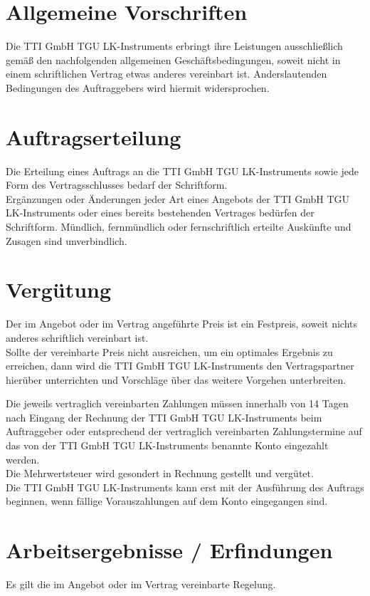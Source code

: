 \documentclass[a4paper, final, 11pt, oneside]{scrartcl}
\begin{document}
\begin{multicols}{2}
\section{Allgemeine Vorschriften}
Die TTI GmbH TGU LK-Instruments erbringt ihre Leistungen ausschließlich gemäß den nachfolgenden allgemeinen Geschäftsbedingungen, soweit nicht in einem schriftlichen Vertrag etwas anderes vereinbart ist. Anderslautenden Bedingungen des Auftraggebers wird hiermit widersprochen.

\section{Auftragserteilung}
Die Erteilung eines Auftrags an die TTI GmbH TGU LK-Instruments sowie jede Form des Vertragsschlusses bedarf der Schriftform.\\
Ergänzungen oder Änderungen jeder Art eines Angebots der TTI GmbH TGU LK-Instruments oder eines bereits bestehenden Vertrages bedürfen der Schriftform. Mündlich, fernmündlich oder fernschriftlich erteilte Auskünfte und Zusagen sind unverbindlich.

\section{Vergütung}
Der im Angebot oder im Vertrag angeführte Preis ist ein Festpreis, soweit nichts anderes schriftlich vereinbart ist.\\
Sollte der vereinbarte Preis nicht ausreichen, um ein optimales Ergebnis zu erreichen, dann wird die TTI GmbH TGU LK-Instruments den Vertragspartner hierüber unterrichten und Vorschläge über das weitere Vorgehen unterbreiten.

Die jeweils vertraglich vereinbarten Zahlungen müssen innerhalb von 14 Tagen nach Eingang der Rechnung der TTI GmbH TGU LK-Instruments beim Auftraggeber oder entsprechend der vertraglich vereinbarten Zahlungstermine auf das von der TTI GmbH TGU LK-Instruments benannte Konto eingezahlt werden.\\
Die Mehrwertsteuer wird gesondert in Rechnung gestellt und vergütet.\\
Die TTI GmbH TGU LK-Instruments kann erst mit der Ausführung des Auftrags beginnen, wenn fällige Vorauszahlungen auf dem Konto eingegangen sind.

\section{Arbeitsergebnisse / Erfindungen}
Es gilt die im Angebot oder im Vertrag vereinbarte Regelung.


\end{multicols}
\end{document}

